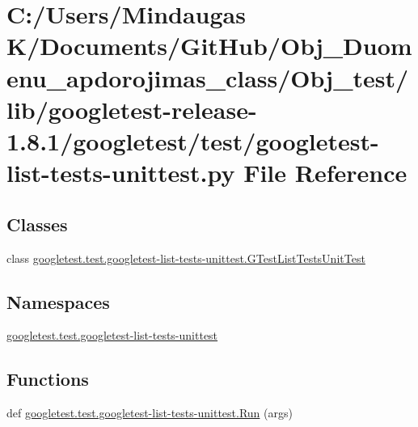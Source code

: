 \hypertarget{_obj__test_2lib_2googletest-release-1_88_81_2googletest_2test_2googletest-list-tests-unittest_8py}{}\section{C\+:/\+Users/\+Mindaugas K/\+Documents/\+Git\+Hub/\+Obj\+\_\+\+Duomenu\+\_\+apdorojimas\+\_\+class/\+Obj\+\_\+test/lib/googletest-\/release-\/1.8.1/googletest/test/googletest-\/list-\/tests-\/unittest.py File Reference}
\label{_obj__test_2lib_2googletest-release-1_88_81_2googletest_2test_2googletest-list-tests-unittest_8py}
\subsection*{Classes}
\begin{DoxyCompactItemize}
\item 
class \mbox{\hyperlink{classgoogletest_1_1test_1_1googletest-list-tests-unittest_1_1_g_test_list_tests_unit_test}{googletest.\+test.\+googletest-\/list-\/tests-\/unittest.\+G\+Test\+List\+Tests\+Unit\+Test}}
\end{DoxyCompactItemize}
\subsection*{Namespaces}
\begin{DoxyCompactItemize}
\item 
 \mbox{\hyperlink{namespacegoogletest_1_1test_1_1googletest-list-tests-unittest}{googletest.\+test.\+googletest-\/list-\/tests-\/unittest}}
\end{DoxyCompactItemize}
\subsection*{Functions}
\begin{DoxyCompactItemize}
\item 
def \mbox{\hyperlink{namespacegoogletest_1_1test_1_1googletest-list-tests-unittest_ad23aeb6dad35d4c52695bf4d7c8ae18a}{googletest.\+test.\+googletest-\/list-\/tests-\/unittest.\+Run}} (args)
\end{DoxyCompactItemize}
